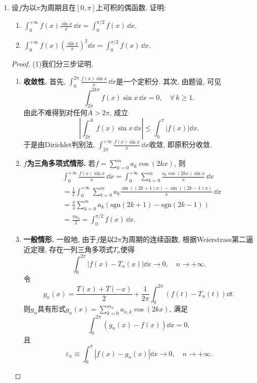 \begin{a}
\begin{enumerate}
\begin{proof}
\begin{align*}
&=2\int_{0}^{1}\left(g^2+2xgg'\right)\dd x+\int_{0}^{1}(g+2xg')^2\,\dd x,\end{align*}
而\(\int_{0}^{1}\left(g^2+2xgg'\right)\dd x
=\left(xg^2\right)\Big|_0^1=g^2(1)\geqslant 0\), 原不等式得证.
\end{proof}
\item 设\(f\)为以\(\pi\)为周期且在\([0,\pi]\)上可积的偶函数. 证明:
\begin{enumerate}[label=(\arabic*)]
\item \(\int_{0}^{+\infty}f(x)\frac{\sin x}{x}\,\dd x=\int_{0}^{\pi/2}f(x)\,\dd x\).
\item \(\int_{0}^{+\infty}f(x)\left(\frac{\sin x}{x}\right)^2\dd x=\int_{0}^{\pi/2}f(x)\,\dd x\).
\end{enumerate}
\begin{proof}
(1)我们分三步证明.
\begin{enumerate}[label=(\roman*)]
\item\textbf{收敛性.} 首先, \(\int_{0}^{2\pi}\frac{f(x)\sin x}{x}\,\dd x\)是一个定积分. 其次, 由题设, 可见
\[\int_{2\pi}^{2k\pi}f(x)\sin x\,\dd x=0,\quad\forall\, k\geqslant 1.\]
由此不难得到对任何\(A>2\pi\), 成立
\[\left|\int_{2\pi}^{A}f(x)\sin x\,\dd x\right|
\leqslant\int_{0}^{\pi}\left|f(x)\right|\dd x.\]
于是由Dirichlet判别法, \(\int_{2\pi}^{+\infty}\frac{f(x)\sin x}{x}\,\dd x\)收敛, 即原积分收敛.
\item\textbf{\(f\)为三角多项式情形.} 若\(f=\sum_{k=0}^{m}a_k\cos (2kx)\), 则
\[\begin{split}
&\int_{0}^{+\infty}\frac{f(x)\sin x}{x}\,\dd x
=\int_{0}^{+\infty}\sum_{k=0}^{m}\frac{a_k\cos(2kx)\sin x}{x}\,\dd x\\
&=\frac{1}{2}\int_{0}^{+\infty}\sum_{k=0}^{m}a_k\frac{\sin\left((2k+1)x\right)-\sin\left((2k-1)x\right)}{x}\,\dd x\\
&=\frac{\pi}{4}\sum_{k=0}^{m}a_k\left(\mathrm{sgn}(2k+1)-\mathrm{sgn}(2k-1)\right)\\
&=\frac{\pi a_0}{2}=\int_{0}^{\pi/2}f(x)\,\dd x.
\end{split}\]
\item\textbf{一般情形.} 一般地, 由于\(f\)是以\(2\pi\)为周期的连续函数, 
根据Weierstrass第二逼近定理, 存在一列三角多项式\(T_n\)使得
\[\int_{0}^{2\pi}\left|f(x)-T_n(x)\right|\dd x\rightarrow 0,\quad n\rightarrow+\infty.\]
令\[g_n(x)=\frac{T(x)+T(-x)}{2}+\frac{1}{2\pi}\int_{0}^{2\pi}\left(f(t)-T_n(t)\right)\dd t.\]
则\(g_n\)具有形式\(g_n(x)=\sum_{k=0}^{m_n}a_{n,k}\cos(2kx)\), 满足
\[\int_{0}^{2\pi}\left(g_n(x)-f(x)\right)\dd x=0,\]
且\[\varepsilon_n\equiv\int_{0}^{\pi}\left|f(x)-g_n(x)\right|\dd x\rightarrow 0,\quad n\rightarrow+\infty.\]

\end{enumerate}
\end{proof}
\end{enumerate}
\end{a}
